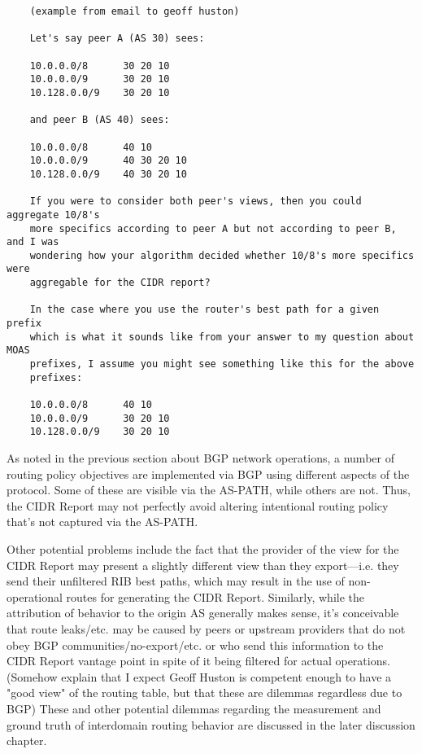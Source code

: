 \begin{verbatim}
	(example from email to geoff huston)

	Let's say peer A (AS 30) sees:

	10.0.0.0/8      30 20 10
	10.0.0.0/9      30 20 10
	10.128.0.0/9    30 20 10

	and peer B (AS 40) sees:

	10.0.0.0/8      40 10
	10.0.0.0/9      40 30 20 10
	10.128.0.0/9    40 30 20 10

	If you were to consider both peer's views, then you could aggregate 10/8's
	more specifics according to peer A but not according to peer B, and I was
	wondering how your algorithm decided whether 10/8's more specifics were
	aggregable for the CIDR report?

	In the case where you use the router's best path for a given prefix
	which is what it sounds like from your answer to my question about MOAS
	prefixes, I assume you might see something like this for the above
	prefixes:

	10.0.0.0/8      40 10
	10.0.0.0/9      30 20 10
	10.128.0.0/9    30 20 10
\end{verbatim}

As noted in the previous section about BGP network operations, a number of routing policy objectives are implemented via BGP using different aspects of the protocol. Some of these are visible via the AS-PATH, while others are not. Thus, the CIDR Report may not perfectly avoid altering intentional routing policy that's not captured via the AS-PATH.

Other potential problems include the fact that the provider of the view for the CIDR Report may present a slightly different view than they export---i.e. they send their unfiltered RIB best paths, which may result in the use of non-operational routes for generating the CIDR Report. Similarly, while the attribution of behavior to the origin AS generally makes sense, it's conceivable that route leaks/etc. may be caused by peers or upstream providers that do not obey BGP communities/no-export/etc. or who send this information to the CIDR Report vantage point in spite of it being filtered for actual operations. (Somehow explain that I expect Geoff Huston is competent enough to have a "good view" of the routing table, but that these are dilemmas regardless due to BGP) These and other potential dilemmas regarding the measurement and ground truth of interdomain routing behavior are discussed in the later discussion chapter.

